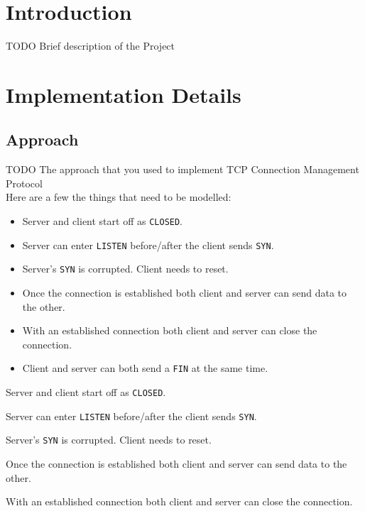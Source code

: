\documentclass{WigReport} \usepackage{epsfig} %
\begin{document}
\MakeTitlePage
\tableofcontents
\clearpage

\section{Introduction}

TODO Brief description of the Project

\section{Implementation Details}

\subsection{Approach}

TODO The approach that you used to implement TCP Connection Management
Protocol \\

Here are a few the things that need to be modelled:
\begin{itemize}
\item Server and client start off as \verb|CLOSED|.
\item Server can enter \verb|LISTEN| before/after the client sends \verb|SYN|.
\item Server's \verb|SYN| is corrupted. Client needs to reset.
\item Once the connection is established both client and server can send data to the other.
\item With an established connection both client and server can close the connection.
\item Client and server can both send a \verb|FIN| at the same time.
\end{itemize}

  \item Server and client start off as \verb|CLOSED|.

  \item Server can enter \verb|LISTEN| before/after the client sends
    \verb|SYN|.

  \item Server's \verb|SYN| is corrupted. Client needs to reset.

  \item Once the connection is established both client and server can send
    data to the other.

  \item With an established connection both client and server can close the
    connection.
\end{document}
